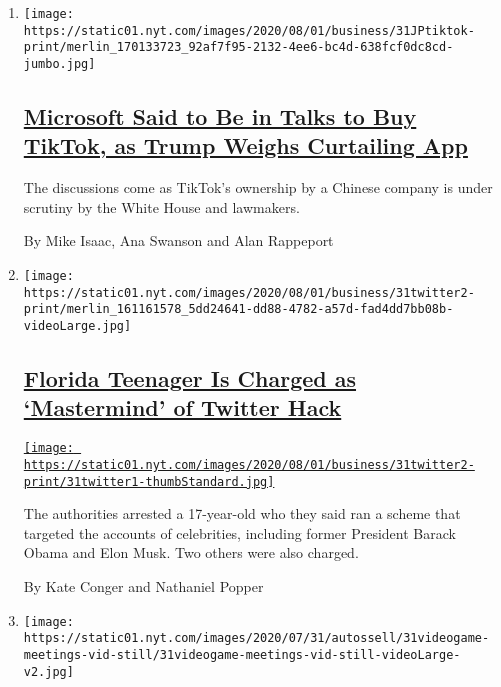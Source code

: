 \begin{enumerate}
\def\labelenumi{\arabic{enumi}.}
\item
  \texttt{[image: https://static01.nyt.com/images/2020/08/01/business/31JPtiktok-print/merlin\_170133723\_92af7f95-2132-4ee6-bc4d-638fcf0dc8cd-jumbo.jpg]}

  \hypertarget{microsoft-said-to-be-in-talks-to-buy-tiktok-as-trump-weighs-curtailing-app}{%
  \subsection{\texorpdfstring{\href{/2020/07/31/technology/tiktok-microsoft.html}{Microsoft
  Said to Be in Talks to Buy TikTok, as Trump Weighs Curtailing
  App}}{Microsoft Said to Be in Talks to Buy TikTok, as Trump Weighs Curtailing App}}\label{microsoft-said-to-be-in-talks-to-buy-tiktok-as-trump-weighs-curtailing-app}}

  The discussions come as TikTok's ownership by a Chinese company is
  under scrutiny by the White House and lawmakers.

  By Mike Isaac, Ana Swanson and Alan Rappeport
\item
  \texttt{[image: https://static01.nyt.com/images/2020/08/01/business/31twitter2-print/merlin\_161161578\_5dd24641-dd88-4782-a57d-fad4dd7bb08b-videoLarge.jpg]}

  \hypertarget{florida-teenager-is-charged-as-mastermind-of-twitter-hack}{%
  \subsection{\texorpdfstring{\href{/2020/07/31/technology/twitter-hack-arrest.html}{Florida
  Teenager Is Charged as `Mastermind' of Twitter
  Hack}}{Florida Teenager Is Charged as `Mastermind' of Twitter Hack}}\label{florida-teenager-is-charged-as-mastermind-of-twitter-hack}}

  \href{/2020/07/31/technology/twitter-hack-arrest.html}{\texttt{[image: https://static01.nyt.com/images/2020/08/01/business/31twitter2-print/31twitter1-thumbStandard.jpg]}}

  The authorities arrested a 17-year-old who they said ran a scheme that
  targeted the accounts of celebrities, including former President
  Barack Obama and Elon Musk. Two others were also charged.

  By Kate Conger and Nathaniel Popper
\item
  \texttt{[image: https://static01.nyt.com/images/2020/07/31/autossell/31videogame-meetings-vid-still/31videogame-meetings-vid-still-videoLarge-v2.jpg]}


\end{enumerate}

